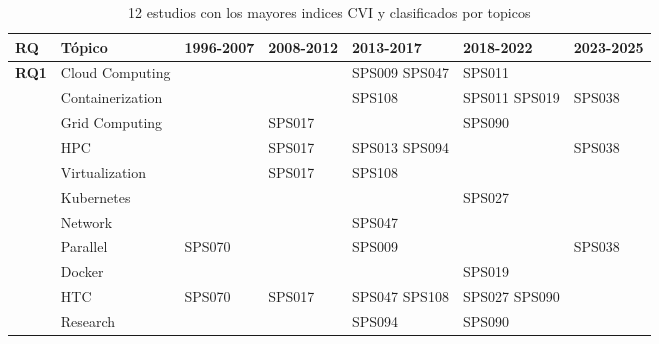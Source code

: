 \begin{table*}[htbp]
	\centering
	\caption{12 estudios con los mayores indices CVI y clasificados por topicos}
	\label{table:highest_CVI}
	\renewcommand{\arraystretch}{1.2}
	\setlength{\tabcolsep}{6pt}
	\begin{tabularx}{\textwidth}{p{0.8cm}p{2.5cm}>{\raggedright\arraybackslash}X>{\raggedright\arraybackslash}X>{\raggedright\arraybackslash}X>{\raggedright\arraybackslash}X>{\raggedright\arraybackslash}X}
		\toprule
		\textbf{RQ}                          & \textbf{Tópico}  & \textbf{1996-2007} & \textbf{2008-2012} & \textbf{2013-2017} & \textbf{2018-2022} & \textbf{2023-2025} \\
		\midrule
		\multirow{12}{*}[0em]{\textbf{RQ1}}  & Cloud Computing  &                    &                    & SPS009 SPS047      & SPS011             &                    \\
		\addlinespace[0.3em]
		                                     & Containerization &                    &                    & SPS108             & SPS011 SPS019      & SPS038             \\
		\addlinespace[0.3em]
		                                     & Grid Computing   &                    & SPS017             &                    & SPS090             &                    \\
		\addlinespace[0.3em]
		                                     & HPC              &                    & SPS017             & SPS013 SPS094      &                    & SPS038             \\
		\addlinespace[0.3em]
		                                     & Virtualization   &                    & SPS017             & SPS108             &                    &                    \\
		\addlinespace[0.3em]
		                                     & Kubernetes       &                    &                    &                    & SPS027             &                    \\
		\addlinespace[0.3em]
		                                     & Network          &                    &                    & SPS047             &                    &                    \\
		\addlinespace[0.3em]
		                                     & Parallel         & SPS070             &                    & SPS009             &                    & SPS038             \\
		\addlinespace[0.3em]
		                                     & Docker           &                    &                    &                    & SPS019             &                    \\
		\addlinespace[0.3em]
		                                     & HTC              & SPS070             & SPS017             & SPS047 SPS108      & SPS027 SPS090      &                    \\
		\midrule
		\multirow{0}{*}[1.2em]{\textbf{RQ2}} & Research         &                    &                    & SPS094             & SPS090             &                    \\
		\bottomrule
	\end{tabularx}
\end{table*}


